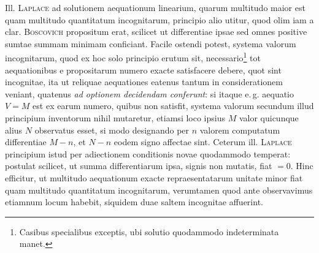 Ill. \textsc{Laplace} ad solutionem aequationum linearium, quarum multitudo maior
est quam multitudo quantitatum incognitarum, principio alio utitur, quod olim
iam a clar. \textsc{Boscovich} propositum erat, scilicet ut differentiae ipsae sed omnes
positive sumtae summam minimam conficiant. Facile ostendi potest, systema
valorum incognitarum, quod ex hoc solo principio erutum sit, necessario\footnote{Casibus specialibus exceptis, ubi solutio quodammodo indeterminata manet.}
tot aequationibus e propositarum numero exacte satisfacere debere, quot sint
incognitae, ita ut reliquae aequationes eatenus tantum in considerationem veniant,
quatenus \emph{ad optionem decidendam conferunt}: si itaque e.\,g. aequatio
$V=M$ est ex earum numero, quibus non satisfit, systema valorum secundum
illud principium inventorum nihil mutaretur, etiamsi loco ipsius $M$ valor quicunque
alius $N$ observatus esset, si modo designando per $n$ valorem computatum
differentiae $M-n$, et $N-n$ eodem signo affectae sint. Ceterum ill.
\textsc{Laplace} principium istud per adiectionem conditionis novae quodammodo
temperat: postulat scilicet, ut summa differentiarum ipsa, signis non mutatis,
fiat $=0$. Hinc efficitur, ut multitudo aequationum exacte repraesentatarum
unitate minor fiat quam multitudo quantitatum incognitarum, verumtamen
quod ante observavimus etiamnum locum habebit, siquidem duae saltem incognitae
affuerint.
